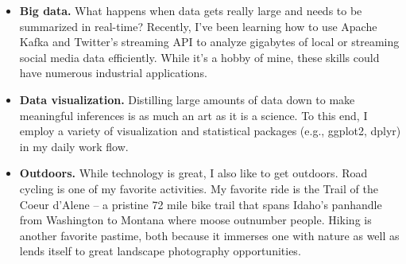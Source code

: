 \documentclass[11pt,letterpaper,sans]{moderncv}        %
\begin{document}
\begin{itemize}



\item{\textbf{Big data.} What happens when data gets really large and needs to be summarized in real-time? Recently, I've been learning how to use Apache Kafka and Twitter's streaming API to analyze gigabytes of local or streaming social media data efficiently. While it's a hobby of mine, these skills could have numerous industrial applications.}


\item{\textbf{Data visualization.} Distilling large amounts of data down to make meaningful inferences is as much an art as it is a science. To this end, I employ a variety of visualization and statistical packages (e.g., ggplot2, dplyr) in my daily work flow.}


\item{\textbf{Outdoors.} While technology is great, I also like to get outdoors. Road cycling is one of my favorite activities. My favorite ride is the Trail of the Coeur d'Alene -- a pristine 72 mile bike trail that spans Idaho's panhandle from Washington to Montana where moose outnumber people. Hiking is another favorite pastime, both because it immerses one with nature as well as lends itself to great landscape photography opportunities.}



\end{itemize}

\end{document}
